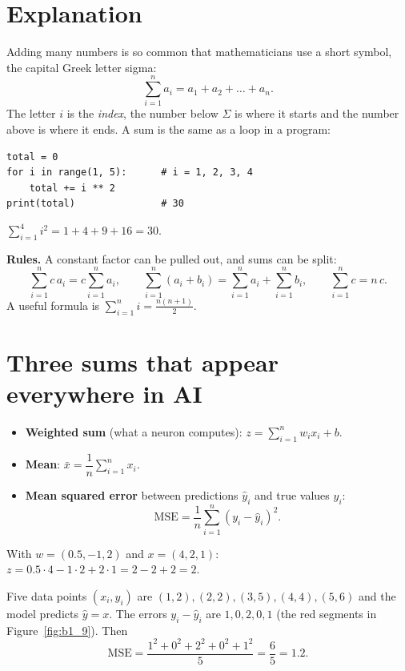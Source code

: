 \label{ch:summation}

\section*{Explanation}
Adding many numbers is so common that mathematicians use a short symbol, the capital Greek letter sigma:
\[
\sum_{i=1}^{n}a_i=a_1+a_2+\dots+a_n.
\]
The letter $i$ is the \emph{index}, the number below $\Sigma$ is where it starts and the number above is where it ends. A sum is the same as a loop in a program:
\begin{verbatim}
total = 0
for i in range(1, 5):      # i = 1, 2, 3, 4
    total += i ** 2
print(total)               # 30
\end{verbatim}

\begin{example}
$\displaystyle\sum_{i=1}^{4}i^2=1+4+9+16=30$.
\end{example}

\textbf{Rules.} A constant factor can be pulled out, and sums can be split:
\[
\sum_{i=1}^n c\,a_i=c\sum_{i=1}^n a_i,\qquad
\sum_{i=1}^n(a_i+b_i)=\sum_{i=1}^n a_i+\sum_{i=1}^n b_i,\qquad
\sum_{i=1}^n c=n\,c.
\]
A useful formula is $\displaystyle\sum_{i=1}^n i=\frac{n(n+1)}{2}$.

\section*{Three sums that appear everywhere in AI}
\begin{itemize}
  \item \textbf{Weighted sum} (what a neuron computes): $z=\displaystyle\sum_{i=1}^n w_ix_i+b$.
  \item \textbf{Mean}: $\bar x=\dfrac1n\displaystyle\sum_{i=1}^n x_i$.
  \item \textbf{Mean squared error} between predictions $\hat y_i$ and true values $y_i$:
  \[
  \mathrm{MSE}=\frac1n\sum_{i=1}^n(y_i-\hat y_i)^2.
  \]
\end{itemize}

\begin{example}
With $w=(0.5,-1,2)$ and $x=(4,2,1)$: $z=0.5\cdot4-1\cdot2+2\cdot1=2-2+2=2$.
\end{example}

\begin{example}
Five data points $(x_i,y_i)$ are $(1,2),(2,2),(3,5),(4,4),(5,6)$ and the model predicts $\hat y=x$. The errors $y_i-\hat y_i$ are $1,0,2,0,1$ (the red segments in Figure~\ref{fig:b1_9}). Then
\[
\mathrm{MSE}=\frac{1^2+0^2+2^2+0^2+1^2}{5}=\frac65=1.2.
\]
\end{example}

